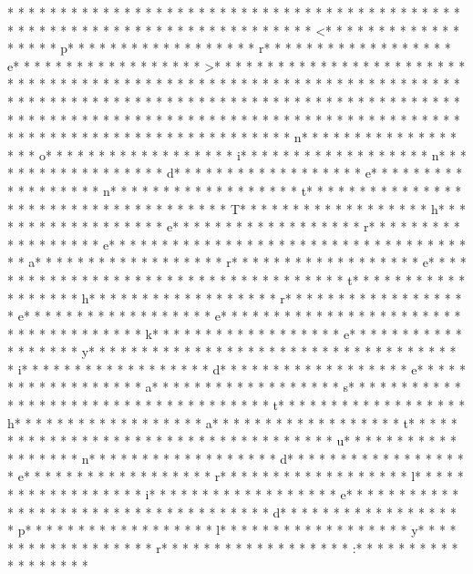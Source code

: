 * * *  * * *  * * *  *  * * *  *  * * *  * 	* * *  * * *  * * *  *  * * *  *  * * *  * 
* * *  * * *  * * *  *  * * *  *  * * *  * 	* * *  * * *  * * *  *  * * *  *  * * *  * <* * *  * * *  * * *  *  * * *  *  * * *  * p* * *  * * *  * * *  *  * * *  *  * * *  * r* * *  * * *  * * *  *  * * *  *  * * *  * e* * *  * * *  * * *  *  * * *  *  * * *  * >* * *  * * *  * * *  *  * * *  *  * * *  * 
* * *  * * *  * * *  *  * * *  *  * * *  * 	* * *  * * *  * * *  *  * * *  *  * * *  * 	* * *  * * *  * * *  *  * * *  *  * * *  * 
* * *  * * *  * * *  *  * * *  *  * * *  * 	* * *  * * *  * * *  *  * * *  *  * * *  * 	* * *  * * *  * * *  *  * * *  *  * * *  * 
* * *  * * *  * * *  *  * * *  *  * * *  * 	* * *  * * *  * * *  *  * * *  *  * * *  * 	* * *  * * *  * * *  *  * * *  *  * * *  * n* * *  * * *  * * *  *  * * *  *  * * *  * o* * *  * * *  * * *  *  * * *  *  * * *  * i* * *  * * *  * * *  *  * * *  *  * * *  * n* * *  * * *  * * *  *  * * *  *  * * *  * d* * *  * * *  * * *  *  * * *  *  * * *  * e* * *  * * *  * * *  *  * * *  *  * * *  * n* * *  * * *  * * *  *  * * *  *  * * *  * t* * *  * * *  * * *  *  * * *  *  * * *  *  * * *  * * *  * * *  *  * * *  *  * * *  * T* * *  * * *  * * *  *  * * *  *  * * *  * h* * *  * * *  * * *  *  * * *  *  * * *  * e* * *  * * *  * * *  *  * * *  *  * * *  * r* * *  * * *  * * *  *  * * *  *  * * *  * e* * *  * * *  * * *  *  * * *  *  * * *  *  * * *  * * *  * * *  *  * * *  *  * * *  * a* * *  * * *  * * *  *  * * *  *  * * *  * r* * *  * * *  * * *  *  * * *  *  * * *  * e* * *  * * *  * * *  *  * * *  *  * * *  *  * * *  * * *  * * *  *  * * *  *  * * *  * t* * *  * * *  * * *  *  * * *  *  * * *  * h* * *  * * *  * * *  *  * * *  *  * * *  * r* * *  * * *  * * *  *  * * *  *  * * *  * e* * *  * * *  * * *  *  * * *  *  * * *  * e* * *  * * *  * * *  *  * * *  *  * * *  *  * * *  * * *  * * *  *  * * *  *  * * *  * k* * *  * * *  * * *  *  * * *  *  * * *  * e* * *  * * *  * * *  *  * * *  *  * * *  * y* * *  * * *  * * *  *  * * *  *  * * *  *  * * *  * * *  * * *  *  * * *  *  * * *  * i* * *  * * *  * * *  *  * * *  *  * * *  * d* * *  * * *  * * *  *  * * *  *  * * *  * e* * *  * * *  * * *  *  * * *  *  * * *  * a* * *  * * *  * * *  *  * * *  *  * * *  * s* * *  * * *  * * *  *  * * *  *  * * *  *  * * *  * * *  * * *  *  * * *  *  * * *  * t* * *  * * *  * * *  *  * * *  *  * * *  * h* * *  * * *  * * *  *  * * *  *  * * *  * a* * *  * * *  * * *  *  * * *  *  * * *  * t* * *  * * *  * * *  *  * * *  *  * * *  *  * * *  * * *  * * *  *  * * *  *  * * *  * u* * *  * * *  * * *  *  * * *  *  * * *  * n* * *  * * *  * * *  *  * * *  *  * * *  * d* * *  * * *  * * *  *  * * *  *  * * *  * e* * *  * * *  * * *  *  * * *  *  * * *  * r* * *  * * *  * * *  *  * * *  *  * * *  * l* * *  * * *  * * *  *  * * *  *  * * *  * i* * *  * * *  * * *  *  * * *  *  * * *  * e* * *  * * *  * * *  *  * * *  *  * * *  *  * * *  * * *  * * *  *  * * *  *  * * *  * d* * *  * * *  * * *  *  * * *  *  * * *  * p* * *  * * *  * * *  *  * * *  *  * * *  * l* * *  * * *  * * *  *  * * *  *  * * *  * y* * *  * * *  * * *  *  * * *  *  * * *  * r* * *  * * *  * * *  *  * * *  *  * * *  * :* * *  * * *  * * *  *  * * *  *  * * *  * 
